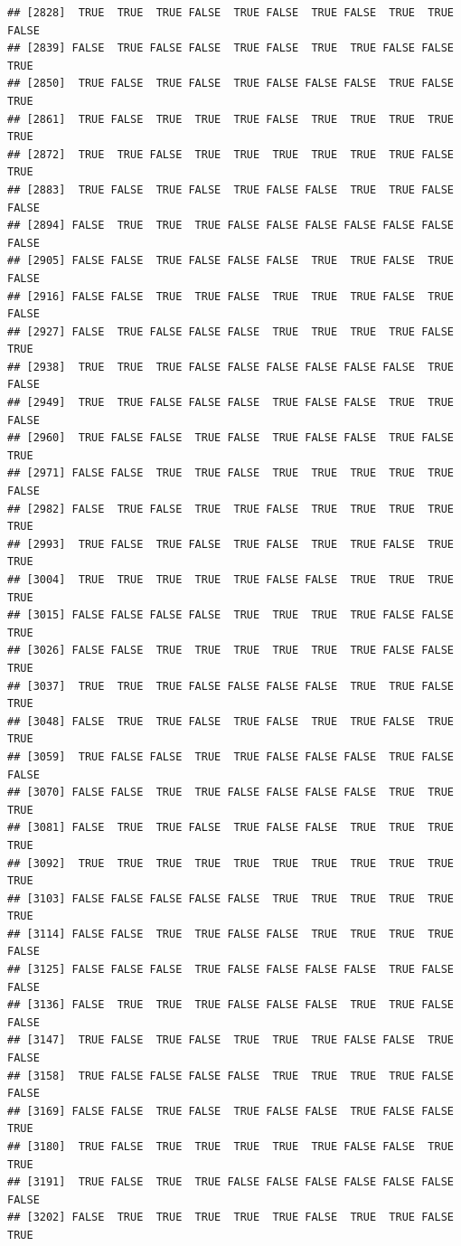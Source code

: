 \documentclass{article}\usepackage[]{graphicx}\usepackage[]{color}
\makeatletter
\newenvironment{kframe}{%
 \def\at@end@of@kframe{}%
 \ifinner\ifhmode%
  \def\at@end@of@kframe{\end{minipage}}%
  \begin{minipage}{\columnwidth}%
 \fi\fi%
 \def\FrameCommand##1{\hskip\@totalleftmargin \hskip-\fboxsep
 \colorbox{shadecolor}{##1}\hskip-\fboxsep
     \hskip-\linewidth \hskip-\@totalleftmargin \hskip\columnwidth}%
 \MakeFramed {\advance\hsize-\width
   \@totalleftmargin\z@ \linewidth\hsize
   \@setminipage}}%
 {\par\unskip\endMakeFramed%
 \at@end@of@kframe}
\newenvironment{knitrout}{}{} %
\makeatother
\begin{document}
\begin{knitrout}
\begin{kframe}
\begin{verbatim}
## [2828]  TRUE  TRUE  TRUE FALSE  TRUE FALSE  TRUE FALSE  TRUE  TRUE FALSE
## [2839] FALSE  TRUE FALSE FALSE  TRUE FALSE  TRUE  TRUE FALSE FALSE  TRUE
## [2850]  TRUE FALSE  TRUE FALSE  TRUE FALSE FALSE FALSE  TRUE FALSE  TRUE
## [2861]  TRUE FALSE  TRUE  TRUE  TRUE FALSE  TRUE  TRUE  TRUE  TRUE  TRUE
## [2872]  TRUE  TRUE FALSE  TRUE  TRUE  TRUE  TRUE  TRUE  TRUE FALSE  TRUE
## [2883]  TRUE FALSE  TRUE FALSE  TRUE FALSE FALSE  TRUE  TRUE FALSE FALSE
## [2894] FALSE  TRUE  TRUE  TRUE FALSE FALSE FALSE FALSE FALSE FALSE FALSE
## [2905] FALSE FALSE  TRUE FALSE FALSE FALSE  TRUE  TRUE FALSE  TRUE FALSE
## [2916] FALSE FALSE  TRUE  TRUE FALSE  TRUE  TRUE  TRUE FALSE  TRUE FALSE
## [2927] FALSE  TRUE FALSE FALSE FALSE  TRUE  TRUE  TRUE  TRUE FALSE  TRUE
## [2938]  TRUE  TRUE  TRUE FALSE FALSE FALSE FALSE FALSE FALSE  TRUE FALSE
## [2949]  TRUE  TRUE FALSE FALSE FALSE  TRUE FALSE FALSE  TRUE  TRUE FALSE
## [2960]  TRUE FALSE FALSE  TRUE FALSE  TRUE FALSE FALSE  TRUE FALSE  TRUE
## [2971] FALSE FALSE  TRUE  TRUE FALSE  TRUE  TRUE  TRUE  TRUE  TRUE FALSE
## [2982] FALSE  TRUE FALSE  TRUE  TRUE FALSE  TRUE  TRUE  TRUE  TRUE  TRUE
## [2993]  TRUE FALSE  TRUE FALSE  TRUE FALSE  TRUE  TRUE FALSE  TRUE  TRUE
## [3004]  TRUE  TRUE  TRUE  TRUE  TRUE FALSE FALSE  TRUE  TRUE  TRUE  TRUE
## [3015] FALSE FALSE FALSE FALSE  TRUE  TRUE  TRUE  TRUE FALSE FALSE  TRUE
## [3026] FALSE FALSE  TRUE  TRUE  TRUE  TRUE  TRUE  TRUE FALSE FALSE  TRUE
## [3037]  TRUE  TRUE  TRUE FALSE FALSE FALSE FALSE  TRUE  TRUE FALSE  TRUE
## [3048] FALSE  TRUE  TRUE FALSE  TRUE FALSE  TRUE  TRUE FALSE  TRUE  TRUE
## [3059]  TRUE FALSE FALSE  TRUE  TRUE FALSE FALSE FALSE  TRUE FALSE FALSE
## [3070] FALSE FALSE  TRUE  TRUE FALSE FALSE FALSE FALSE  TRUE  TRUE  TRUE
## [3081] FALSE  TRUE  TRUE FALSE  TRUE FALSE FALSE  TRUE  TRUE  TRUE  TRUE
## [3092]  TRUE  TRUE  TRUE  TRUE  TRUE  TRUE  TRUE  TRUE  TRUE  TRUE  TRUE
## [3103] FALSE FALSE FALSE FALSE FALSE  TRUE  TRUE  TRUE  TRUE  TRUE  TRUE
## [3114] FALSE FALSE  TRUE  TRUE FALSE FALSE  TRUE  TRUE  TRUE  TRUE FALSE
## [3125] FALSE FALSE FALSE  TRUE FALSE FALSE FALSE FALSE  TRUE FALSE FALSE
## [3136] FALSE  TRUE  TRUE  TRUE FALSE FALSE FALSE  TRUE  TRUE FALSE FALSE
## [3147]  TRUE FALSE  TRUE FALSE  TRUE  TRUE  TRUE FALSE FALSE  TRUE FALSE
## [3158]  TRUE FALSE FALSE FALSE FALSE  TRUE  TRUE  TRUE  TRUE FALSE FALSE
## [3169] FALSE FALSE  TRUE FALSE  TRUE FALSE FALSE  TRUE FALSE FALSE  TRUE
## [3180]  TRUE FALSE  TRUE  TRUE  TRUE  TRUE  TRUE FALSE FALSE  TRUE  TRUE
## [3191]  TRUE FALSE  TRUE  TRUE FALSE FALSE FALSE FALSE FALSE FALSE FALSE
## [3202] FALSE  TRUE  TRUE  TRUE  TRUE  TRUE FALSE  TRUE  TRUE FALSE  TRUE

\end{verbatim}
\end{kframe}
\end{knitrout}
\end{document}
